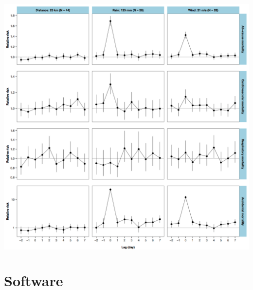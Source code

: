 \documentclass[ignorenonframetext,]{beamer}
\begin{document}
\begin{frame}[plain]

\begin{center}\includegraphics[width=15.62in,height=1.1\textheight]{tropical_storm_rrs} \end{center}

\end{frame}

\section{Software}\label{software}
\end{document}
